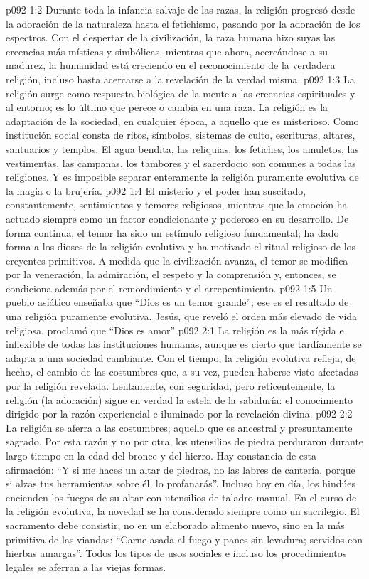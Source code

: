 \vs p092 1:2 Durante toda la infancia salvaje de las razas, la religión progresó desde la adoración de la naturaleza hasta el fetichismo, pasando por la adoración de los espectros. Con el despertar de la civilización, la raza humana hizo suyas las creencias más místicas y simbólicas, mientras que ahora, acercándose a su madurez, la humanidad está creciendo en el reconocimiento de la verdadera religión, incluso hasta acercarse a la revelación de la verdad misma.
\vs p092 1:3 La religión surge como respuesta biológica de la mente a las creencias espirituales y al entorno; es lo último que perece o cambia en una raza. La religión es la adaptación de la sociedad, en cualquier época, a aquello que es misterioso. Como institución social consta de ritos, símbolos, sistemas de culto, escrituras, altares, santuarios y templos. El agua bendita, las reliquias, los fetiches, los amuletos, las vestimentas, las campanas, los tambores y el sacerdocio son comunes a todas las religiones. Y es imposible separar enteramente la religión puramente evolutiva de la magia o la brujería.
\vs p092 1:4 El misterio y el poder han suscitado, constantemente, sentimientos y temores religiosos, mientras que la emoción ha actuado siempre como un factor condicionante y poderoso en su desarrollo. De forma continua, el temor ha sido un estímulo religioso fundamental; ha dado forma a los dioses de la religión evolutiva y ha motivado el ritual religioso de los creyentes primitivos. A medida que la civilización avanza, el temor se modifica por la veneración, la admiración, el respeto y la comprensión y, entonces, se condiciona además por el remordimiento y el arrepentimiento.
\vs p092 1:5 Un pueblo asiático enseñaba que “Dios es un temor grande”; ese es el resultado de una religión puramente evolutiva. Jesús, que reveló el orden más elevado de vida religiosa, proclamó que “Dios es amor”
\vs p092 2:1 La religión es la más rígida e inflexible de todas las instituciones humanas, aunque es cierto que tardíamente se adapta a una sociedad cambiante. Con el tiempo, la religión evolutiva refleja, de hecho, el cambio de las costumbres que, a su vez, pueden haberse visto afectadas por la religión revelada. Lentamente, con seguridad, pero reticentemente, la religión (la adoración) sigue en verdad la estela de la sabiduría: el conocimiento dirigido por la razón experiencial e iluminado por la revelación divina.
\vs p092 2:2 La religión se aferra a las costumbres; aquello que  es ancestral y presuntamente sagrado. Por esta razón y no por otra, los utensilios de piedra perduraron durante largo tiempo en la edad del bronce y del hierro. Hay constancia de esta afirmación: “Y si me haces un altar de piedras, no las labres de cantería, porque si alzas tus herramientas sobre él, lo profanarás”. Incluso hoy en día, los hindúes encienden los fuegos de su altar con utensilios de taladro manual. En el curso de la religión evolutiva, la novedad se ha considerado siempre como un sacrilegio. El sacramento debe consistir, no en un elaborado alimento nuevo, sino en la más primitiva de las viandas: “Carne asada al fuego y panes sin levadura; servidos con hierbas amargas”. Todos los tipos de usos sociales e incluso los procedimientos legales se aferran a las viejas formas.

